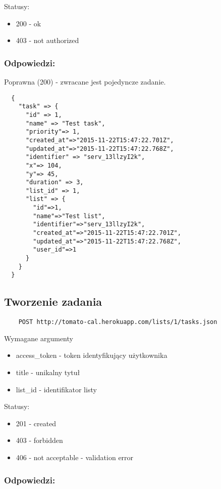 Statusy:
\begin{itemize}
  \item 200 - ok
  \item 403 - not authorized
\end{itemize}

\subsubsection{Odpowiedzi:}

Poprawna (200) - zwracane jest pojedyncze zadanie.

\begin{lstlisting}
  {
    "task" => {
      "id" => 1,
      "name" => "Test task",
      "priority"=> 1,
      "created_at"=>"2015-11-22T15:47:22.701Z",
      "updated_at"=>"2015-11-22T15:47:22.768Z",
      "identifier" => "serv_13llzyI2k",
      "x"=> 104,
      "y"=> 45,
      "duration" => 3,
      "list_id" => 1,
      "list" => {
        "id"=>1,
        "name"=>"Test list",
        "identifier"=>"serv_13llzyI2k",
        "created_at"=>"2015-11-22T15:47:22.701Z",
        "updated_at"=>"2015-11-22T15:47:22.768Z",
        "user_id"=>1
      }
    }
  }
\end{lstlisting}


\subsection{Tworzenie zadania}

\begin{lstlisting}
    POST http://tomato-cal.herokuapp.com/lists/1/tasks.json
\end{lstlisting}

Wymagane argumenty
\begin{itemize}
  \item access\_token - token identyfikujący użytkownika
  \item title - unikalny tytuł
  \item list\_id - identifikator listy
\end{itemize}

Statusy:
\begin{itemize}
  \item 201 - created
  \item 403 - forbidden
  \item 406 - not acceptable - validation error
\end{itemize}

\subsubsection{Odpowiedzi:}

